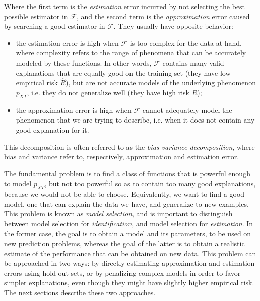 \documentclass[a4paper]{book}
\begin{document}
Where the first term is the \emph{estimation} error incurred by not selecting the best possible estimator in $\mathcal{F}$, and the second term is the \emph{approximation} error caused by searching a good estimator in $\mathcal{F}$. They usually have opposite behavior:

\begin{itemize}
\item the estimation error is high when $\mathcal{F}$ is too complex for the data at hand, where complexity refers to the range of phenomena that can be accurately modeled by these functions. In other words, $\mathcal{F}$ contains many valid explanations that are equally good on the training set (they have low empirical risk $\hat{R}$), but are not accurate models of the underlying phenomenon $p_{XT}$, i.e. they do not generalize well (they have high risk $R$);
\item the approximation error is high when $\mathcal{F}$ cannot adequately model the phenomenon that we are trying to describe, i.e. when it does not contain any good explanation for it.
\end{itemize}

This decomposition is often referred to as the \emph{bias-variance decomposition}, where bias and variance refer to, respectively, approximation and estimation error.

The fundamental problem is to find a class of functions that is powerful enough to model $p_{XT}$, but not too powerful so as to contain too many good explanations, because we would not be able to choose. Equivalently, we want to find a good model, one that can explain the data we have, and generalize to new examples. This problem is known as \emph{model selection}, and is important to distinguish between model selection for \emph{identification}, and model selection for \emph{estimation}. In the former case, the goal is to obtain a model and its parameters, to be used on new prediction problems, whereas the goal of the latter is to obtain a realistic estimate of the performance that can be obtained on new data. This problem can be approached in two ways: by directly estimating approximation and estimation errors using hold-out sets, or by penalizing complex models in order to favor simpler explanations, even though they might have slightly higher empirical risk. The next sections describe these two approaches.
\end{document}
